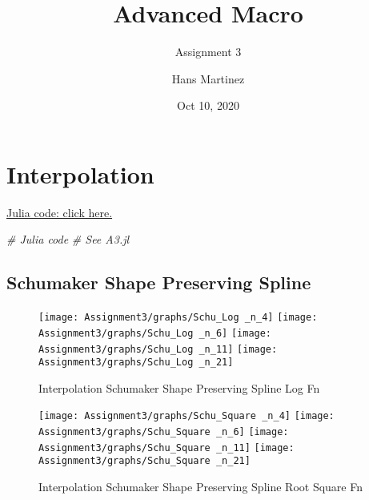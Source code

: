 \documentclass[]{article}
\title{Advanced Macro}
\subtitle{Assignment 3}
\author{Hans Martinez}
\date{Oct 10, 2020}
\newenvironment{Shaded}{\begin{snugshade}}{\end{snugshade}}
\newcommand{\CommentTok}[1]{\textcolor[rgb]{0.56,0.35,0.01}{\textit{#1}}}
\begin{document}
\maketitle

\hypertarget{interpolation}{%
\section{Interpolation}\label{interpolation}}

\href{https://github.com/hans-mtz/AdvMacro/blob/master/A3.jl}{Julia
code: click here.}

\begin{Shaded}
\begin{Highlighting}[]
\CommentTok{# Julia code}
\CommentTok{# See A3.jl}
\end{Highlighting}
\end{Shaded}

\hypertarget{schumaker-shape-preserving-spline}{%
\subsection{Schumaker Shape Preserving
Spline}\label{schumaker-shape-preserving-spline}}

\begin{figure}

{\centering \texttt{[image: Assignment3/graphs/Schu\_Log \_n\_4]} \texttt{[image: Assignment3/graphs/Schu\_Log \_n\_6]} \texttt{[image: Assignment3/graphs/Schu\_Log \_n\_11]} \texttt{[image: Assignment3/graphs/Schu\_Log \_n\_21]} 

}

\caption{Interpolation Schumaker Shape Preserving Spline Log Fn}\label{fig:unnamed-chunk-2}
\end{figure}

\begin{figure}

{\centering \texttt{[image: Assignment3/graphs/Schu\_Square \_n\_4]} \texttt{[image: Assignment3/graphs/Schu\_Square \_n\_6]} \texttt{[image: Assignment3/graphs/Schu\_Square \_n\_11]} \texttt{[image: Assignment3/graphs/Schu\_Square \_n\_21]} 

}

\caption{Interpolation Schumaker Shape Preserving Spline Root Square Fn}\label{fig:unnamed-chunk-3}
\end{figure}
\end{document}
